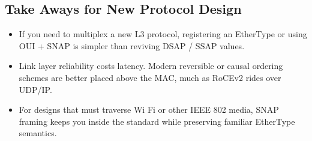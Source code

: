 \subsection{Take Aways for New Protocol Design}

\begin{itemize}
  \item If you need to multiplex a new L3 protocol, registering an EtherType or using OUI + SNAP is simpler than reviving DSAP / SSAP values.
  \item Link layer reliability costs latency. Modern reversible or causal ordering schemes are better placed above the MAC, much as RoCEv2 rides over UDP/IP.
  \item For designs that must traverse Wi Fi or other IEEE 802 media, SNAP framing keeps you inside the standard while preserving familiar EtherType semantics.
\end{itemize}